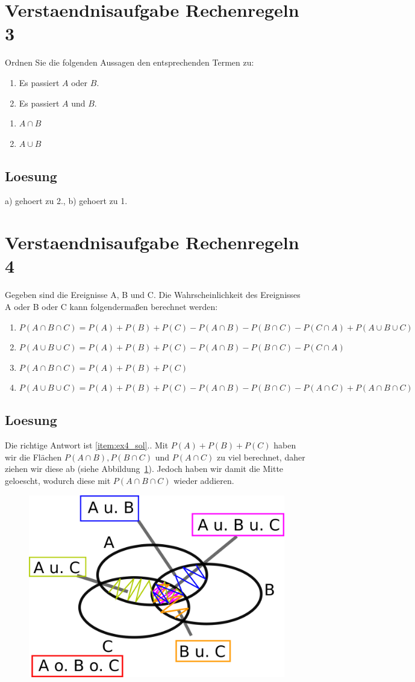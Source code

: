 \documentclass[]{article}
\begin{document}
\section{Verstaendnisaufgabe Rechenregeln 3}

Ordnen Sie die folgenden Aussagen den entsprechenden Termen zu:

\begin{enumerate}[label=\alph*)]
	\item Es passiert $A$ oder $B$. 
	\item Es passiert $A$ und $B$.
\end{enumerate}

\begin{enumerate}
	\item $A \cap B$
	\item $A \cup B$
\end{enumerate}

\subsection{Loesung}

a) gehoert zu 2., b) gehoert zu 1.

\section{Verstaendnisaufgabe Rechenregeln 4}

Gegeben sind die Ereignisse A, B und C. Die Wahrscheinlichkeit des Ereignisses A oder B oder C kann folgendermaßen berechnet werden: 

\begin{enumerate}
	\item $P(A \cap B \cap C) = P(A) + P(B) + P(C) - P(A \cap B) - P(B \cap C) - P(C \cap A) + P(A \cup B \cup C)$
	\item $P(A \cup B \cup C) = P(A) + P(B) + P(C) - P(A \cap B) - P(B \cap C) - P(C \cap A)$
	\item $P(A \cap B \cap C) = P(A) + P(B) + P(C)$
	\item $P(A \cup B \cup C) = P(A) + P(B) + P(C) - P(A \cap B) - P(B \cap C) - P(A \cap C) + P(A \cap B \cap C)$ \label{item:ex4_sol}
\end{enumerate}

\subsection{Loesung}

Die richtige Antwort ist \ref{item:ex4_sol}.. Mit $P(A) + P(B) + P(C)$ haben wir die Flächen $P(A \cap B), P(B \cap C)$ und $P(A \cap C)$ zu viel berechnet, daher ziehen wir diese ab (siehe Abbildung~\ref{fig:verstaendnis_4}). Jedoch haben wir damit die Mitte geloescht, wodurch diese mit $P(A \cap B \cap C)$ wieder addieren. 

\begin{figure}
	\centering
	\includegraphics[width=0.5\columnwidth]{./verstaendnis_4/erklaerung.png}
	\label{fig:verstaendnis_4}
\end{figure}
\end{document}
